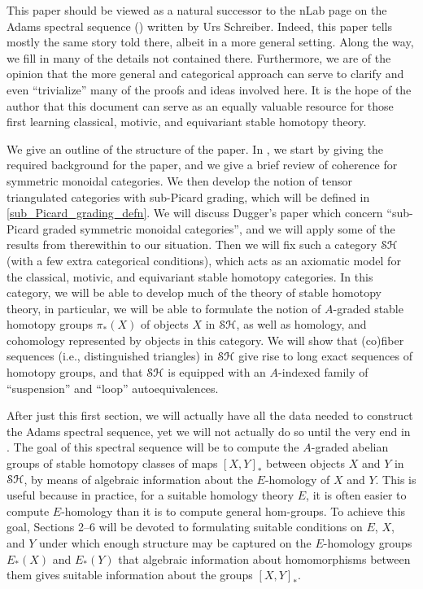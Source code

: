 \documentclass[../main.tex]{subfiles}
\begin{document}
This paper should be viewed as a natural successor to the nLab page on the Adams spectral sequence (\cite{nlab:introduction_to_the_adams_spectral_sequence}) written by Urs Schreiber.  Indeed, this paper tells mostly the same story told there, albeit in a more general setting. Along the way, we fill in many of the details not contained there. Furthermore, we are of the opinion that the more general and categorical approach can serve to clarify and even ``trivialize'' many of the proofs and ideas involved here. It is the hope of the author that this document can serve as an equally valuable resource for those first learning classical, motivic, and equivariant stable homotopy theory.

We give an outline of the structure of the paper. In , we start by giving the required background for the paper, and we give a brief review of coherence for symmetric monoidal categories. We then develop the notion of tensor triangulated categories with sub-Picard grading, which will be defined in \autoref{sub_Picard_grading_defn}. We will discuss Dugger's paper \cite{Dugger_2014} which concern ``sub-Picard graded symmetric monoidal categories'', and we will apply some of the results from therewithin to our situation. Then we will fix such a category $\mathcal{SH}$ (with a few extra categorical conditions), which acts as an axiomatic model for the classical, motivic, and equivariant stable homotopy categories. In this category, we will be able to develop much of the theory of stable homotopy theory, in particular, we will be able to formulate the notion of $A$-graded stable homotopy groups $\pi_*(X)$ of objects $X$ in $\mathcal{SH}$, as well as homology, and cohomology represented by objects in this category. We will show that (co)fiber sequences (i.e., distinguished triangles) in $\mathcal{SH}$ give rise to long exact sequences of homotopy groups, and that $\mathcal{SH}$ is equipped with an $A$-indexed family of ``suspension'' and ``loop'' autoequivalences.

After just this first section, we will actually have all the data needed to construct the Adams spectral sequence, yet we will not actually do so until the very end in . The goal of this spectral sequence will be to compute the $A$-graded abelian groups of stable homotopy classes of maps ${[X,Y]}_*$ between objects $X$ and $Y$ in $\mathcal{SH}$, by means of algebraic information about the $E$-homology of $X$ and $Y$. This is useful because in practice, for a suitable homology theory $E$, it is often  easier to compute $E$-homology than it is to compute general hom-groups. To achieve this goal, Sections 2--6 will be devoted to formulating suitable conditions on $E$, $X$, and $Y$ under which enough structure may be captured on the $E$-homology groups $E_*(X)$ and $E_*(Y)$ that algebraic information about homomorphisms between them gives suitable information about the groups ${[X,Y]}_*$.
\end{document}
